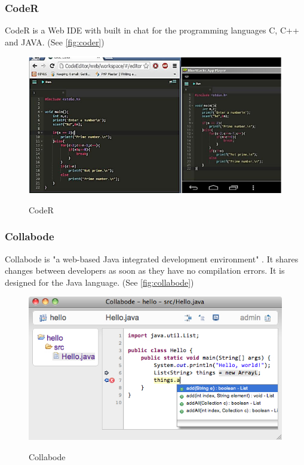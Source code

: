 \subsubsection{CodeR}
CodeR \cite{KurniawanSoesantoWijaya:2015:CodeR:Real-timeCodeEditorApplicationforCollaborativeProgramming} is a Web IDE with built in chat for the programming languages C, C++ and JAVA. (See \autoref{fig:coder})
\begin{figure}[hb]
    \centering
    \includegraphics[width=1\linewidth]{figures/screenshots/CodeR.png}
	\caption{CodeR }
	\cite{KurniawanSoesantoWijaya:2015:CodeR:Real-timeCodeEditorApplicationforCollaborativeProgramming}
    \label{fig:coder}
\end{figure}

\subsubsection{Collabode}
Collabode is "a web-based Java integrated development environment" \cite{Goldman:2011:RCC:2047196.2047215}. It shares changes between developers as soon as they have no compilation errors. It is designed for the Java language. (See \autoref{fig:collabode})
\begin{figure}[h]
    \centering
    \includegraphics[width=1\linewidth]{figures/screenshots/collabode.jpg}
	\caption{Collabode}
	\cite{Goldman:2011:RCC:2047196.2047215}
    \label{fig:collabode}
\end{figure}

